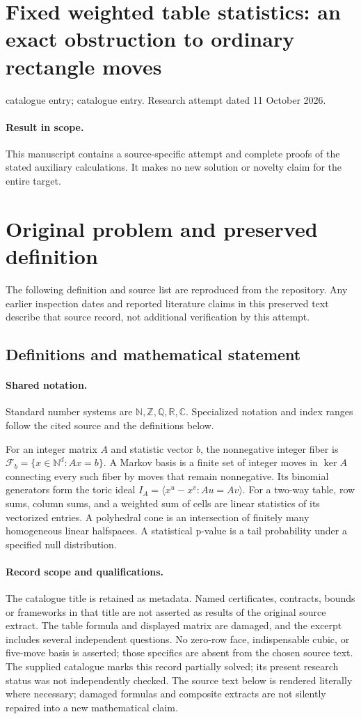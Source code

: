 \documentclass[11pt]{article}
\begin{document}
\section*{Fixed weighted table statistics: an exact obstruction to ordinary rectangle moves}
\noindent catalogue entry; catalogue entry. Research attempt dated 11 October 2026.
\paragraph{Result in scope.}This manuscript contains a source-specific attempt and complete proofs of the stated auxiliary calculations. It makes no new solution or novelty claim for the entire target.
\section{Original problem and preserved definition}
The following definition and source list are reproduced from the repository. Any earlier inspection dates and reported literature claims in this preserved text describe that source record, not additional verification by this attempt.
\subsection{Definitions and mathematical statement}

\paragraph{Shared notation.}Standard number systems are $\mathbb N,\mathbb Z,\mathbb Q,\mathbb R,\mathbb C$. Specialized notation and index ranges follow the cited source and the definitions below.


For an integer matrix $A$ and statistic vector $b$, the nonnegative integer fiber is $\mathcal F_b=\{x\in\mathbb N^d:Ax=b\}$. A Markov basis is a finite set of integer moves in $\ker A$ connecting every such fiber by moves that remain nonnegative. Its binomial generators form the toric ideal $I_A=\langle x^u-x^v:Au=Av\rangle$. For a two-way table, row sums, column sums, and a weighted sum of cells are linear statistics of its vectorized entries. A polyhedral cone is an intersection of finitely many homogeneous linear halfspaces. A statistical p-value is a tail probability under a specified null distribution.
\paragraph{Record scope and qualifications.}
The catalogue title is retained as metadata. Named certificates, contracts, bounds or frameworks in that title are not asserted as results of the original source extract.
The table formula and displayed matrix are damaged, and the excerpt includes several independent questions. No zero-row face, indispensable cubic, or five-move basis is asserted; those specifics are absent from the chosen source text. The supplied catalogue marks this record partially solved; its present research status was not independently checked.
The source text below is rendered literally where necessary; damaged formulas and composite extracts are not silently repaired into a new mathematical claim.
\end{document}
